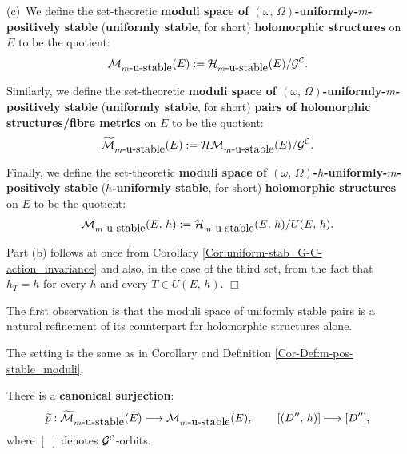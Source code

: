 \documentclass[12pt]{article}
\begin{document}
\begin{Cor-Def}
\vspace{1ex}

(c)\, We define the set-theoretic {\bf moduli space of $(\omega,\,\Omega)$-uniformly-$m$-positively stable} ({\bf uniformly stable}, for short) {\bf holomorphic structures} on $E$ to be the quotient: \begin{eqnarray*}{\cal M}_{m\mbox{-u-stable}}(E):={\cal H}_{m\mbox{-u-stable}}(E)/{\cal G}^{\cal C}.\end{eqnarray*}

Similarly, we define the set-theoretic {\bf moduli space of $(\omega,\,\Omega)$-uniformly-$m$-positively stable} ({\bf uniformly stable}, for short) {\bf pairs of holomorphic structures/fibre metrics} on $E$ to be the quotient: \begin{eqnarray*}\widetilde{\cal M}_{m\mbox{-u-stable}}(E):={\cal HM}_{m\mbox{-u-stable}}(E)/{\cal G}^{\cal C}.\end{eqnarray*}

Finally, we define the set-theoretic {\bf moduli space of $(\omega,\,\Omega)$-$h$-uniformly-$m$-positively stable} ({\bf $h$-uniformly stable}, for short) {\bf holomorphic structures} on $E$ to be the quotient: \begin{eqnarray*}{\cal M}_{m\mbox{-u-stable}}(E,\,h):={\cal H}_{m\mbox{-u-stable}}(E,\,h)/U(E,\,h).\end{eqnarray*}

\end{Cor-Def}


 Part (b) follows at once from Corollary \ref{Cor:uniform-stab_G-C-action_invariance} and also, in the case of the third set, from the fact that $h_T = h$ for every $h$ and every $T\in U(E,\,h)$. \hfill $\Box$


\vspace{2ex}

The first observation is that the moduli space of uniformly stable pairs is a natural refinement of its counterpart for holomorphic structures alone.

\begin{Cor}\label{Cor:can-surjection_u-stable_moduli-spaces} The setting is the same as in Corollary and Definition \ref{Cor-Def:m-pos-stable_moduli}.

  There is a {\bf canonical surjection}: \begin{eqnarray*}\widetilde{p}:\widetilde{\cal M}_{m\mbox{-u-stable}}(E)\longrightarrow{\cal M}_{m\mbox{-u-stable}}(E), \hspace{5ex} [(D'',\,h)]\longmapsto[D''],\end{eqnarray*} where $[\,\,]$ denotes ${\cal G}^{\cal C}$-orbits.


\end{Cor}
\end{document}
